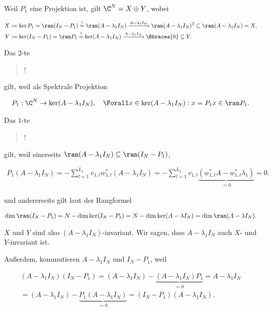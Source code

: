 \begin{remark} \label{rem:spektrale_projektion_linear}

    Weil $P_1$ eine Projektion ist, gilt $\C^N = X \oplus Y$, wobei

    \begin{align*}
        X & := \ker P_1 = \ran (I_N - P_1) \stackrel{!}{=} \ran (A - \lambda_1 I_N) \xrightarrow{A - \lambda_1 I_N} \ran (A - \lambda_1 I_N)^2 \subseteq \ran (A - \lambda_1 I_N) = X, \\
        Y & := \ker (I_N - P_1) = \ran P_1 \stackrel{!}{=} \ker (A - \lambda_1 I_N) \xrightarrow{A - \lambda_1 I_N} \Bbraces{0} \subseteq Y.
    \end{align*}

    Das $2$-te \blockquote{!} gilt, weil als Spektrale Projektion

    \begin{align*}
        P_1: \C^N \to \ker (A - \lambda_1 I_N),
        \quad
        \Forall x \in \ker (A - \lambda_1 I_N):
            x = P_1 x \in \ran P_1.
    \end{align*}

    Das $1$-te \blockquote{!} gilt, weil einerseits $\ran (A - \lambda_1 I_N) \subseteq \ran (I_N - P_1)$,

    \begin{align*}
        P_1 (A - \lambda_1 I_N)
        =
        -\sum_{l=1}^{L_1}
            v_{1, l} w_{1, l}^\ast
        (A - \lambda_1 I_N)
        =
        -\sum_{l=1}^{L_1}
            v_{1, l}
            \underbrace
            {
                (w_{1, l}^\ast A
                -
                w_{1, l}^\ast \lambda_1)
            }_{=0}
        =
        0.
    \end{align*}

    und andererseits gilt laut der Rangformel

    \begin{align*}
        \dim \ran (I_N - P_1)
        =
        N - \dim \ker (I_N - P_1)
        =
        N - \dim \ker (A - \lambda I_N)
        =
        \dim \ran (A - \lambda I_N).
    \end{align*}

    $X$ und $Y$ sind also $(A - \lambda_1 I_N)$-invariant.
    Wir sagen, dass $A - \lambda_1 I_N$ auch $X$- und $Y$-invariant ist.

    Außerdem, kommutieren $A - \lambda_1 I_N$ und $I_N - P_1$, weil

    \begin{multline*}
        (A - \lambda_1 I_N) (I_N - P_1)
        =
        (A - \lambda_1 I_N) - \underbrace{(A - \lambda_1 I_N) P_1}_{=0}
        =
        A - \lambda_1 I_N \\
        =
        (A - \lambda_1 I_N) - \underbrace{P_1 (A - \lambda_1 I_N)}_{=0}
        =
        (I_N - P_1) (A - \lambda_1 I_N).
    \end{multline*}

\end{remark}
